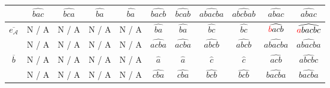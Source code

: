 \begin{table*}[!t]
\begin{minipage}{\textwidth}
\begin{tabular}{| c |c c| c c| c c |c c |c c|}
 \rowcolor{gray!10}\multirow{1}{*}{$\overline{abcb}$}&$\widehat{bac}$&$\widehat{bca}$&$\widehat{ba}$ &$\widehat{ba}$&$\widehat{bacb}$ &$\widehat{bcab}$&$\widehat{abacba}$&$\widehat{abcbab}$&$\widehat{abac}$ &$\widehat{abac}$\\   
\hline
 \hline
 \multirow{1}{*}{$\overline{e_\mathcal{A}}$}&N / A&N / A&N / A &N / A & $\widehat{ba}$& $\widehat{ba}$ & $\widehat{bc}$& $\widehat{bc}$ & $\widehat{\textcolor{red}{b}acb}$& $\widehat{\textcolor{red}{a}bacbc}$\\ 
 \rowcolor{gray!10}\multirow{1}{*}{$\overline{ac}$}&N / A&N / A&N / A &N / A &$\widehat{acba}$&$\widehat{acba}$ &$\widehat{abcb}$&$\widehat{abcb}$& $\widehat{abacba}$ & $\widehat{abacba}$\\ \hline
 \hline
 \multirow{1}{*}{$\overline{b}$}&N / A&N / A&N / A &N / A & $\widehat{a}$& $\widehat{a}$ & $\widehat{c}$& $\widehat{c}$& $\widehat{acb}$ & $\widehat{abcbc}$\\ 
 \rowcolor{gray!10}\multirow{1}{*}{$\overline{c}$}&N / A&N / A&N / A &N / A &$\widehat{cba}$&$\widehat{cba}$ &$\widehat{bcb}$&$\widehat{bcb}$  & $\widehat{bacba}$& $\widehat{bacba}$\\ \hline
\end{tabular}
\end{minipage}
\end{table*}